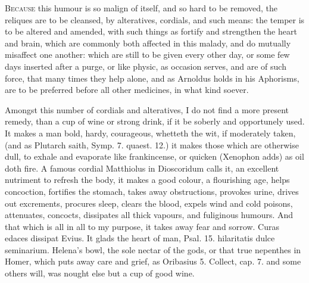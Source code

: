 \lettrine{B}{ecause} this humour is so malign of itself, and so hard to be removed,
the reliques are to be cleansed, by alteratives, cordials, and such
means: the temper is to be altered and amended, with such things as
fortify and strengthen the heart and brain, which are commonly
both affected in this malady, and do mutually misaffect one another:
which are still to be given every other day, or some few days inserted
after a purge, or like physic, as occasion serves, and are of such
force, that many times they help alone, and as Arnoldus holds in
his Aphorisms, are to be preferred before all other medicines, in what
kind soever.

Amongst this number of cordials and alteratives, I do not find a more
present remedy, than a cup of wine or strong drink, if it be soberly
and opportunely used. It makes a man bold, hardy, courageous,
whetteth the wit, if moderately taken, (and as Plutarch
saith, Symp. 7. quaest. 12.) it makes those which are otherwise
dull, to exhale and evaporate like frankincense, or quicken (Xenophon
adds) as oil doth fire. A famous cordial Matthiolus in
Dioscoridum calls it, an excellent nutriment to refresh the body, it
makes a good colour, a flourishing age, helps concoction, fortifies the
stomach, takes away obstructions, provokes urine, drives out
excrements, procures sleep, clears the blood, expels wind and cold
poisons, attenuates, concocts, dissipates all thick vapours, and
fuliginous humours. And that which is all in all to my purpose, it
takes away fear and sorrow. Curas edaces dissipat Evius. It glads
the heart of man, Psal.  15. hilaritatis dulce seminarium. Helena's
bowl, the sole nectar of the gods, or that true nepenthes in
Homer, which puts away care and grief, as Oribasius 5. Collect,
cap. 7. and some others will, was nought else but a cup of good wine.

